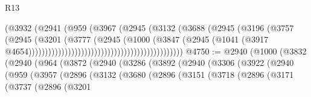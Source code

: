 \begin{lexlean}{R13}
\begin{coremodule}
                                                            (@3932
                                                              (@2941
                                                                (@959
                                                                  (@3967
                                                                    (@2945
                                                                      (@3132
                                                                        (@3688
                                                                          (@2945
                                                                            (@3196
                                                                              (@3757
                                                                                (@2945
                                                                                  (@3201
                                                                                    (@3777
                                                                                      (@2945
                                                                                        (@1000
                                                                                          (@3847
                                                                                            (@2945
                                                                                              (@1041
                                                                                                (@3917
                                                                                                  @4654)))))))))))))))))))))))))))))))))))))))))))))))
@4750 := @2940
    (@1000
      (@3832
        (@2940
          (@964
            (@3872
              (@2940
                (@3286
                  (@3892
                    (@2940
                      (@3306
                        (@3922
                          (@2940
                            (@959
                              (@3957
                                (@2896
                                  (@3132
                                    (@3680
                                      (@2896
                                        (@3151
                                          (@3718
                                            (@2896
                                              (@3171
                                                (@3737
                                                  (@2896
                                                    (@3201

\end{coremodule}
\end{lexlean}
